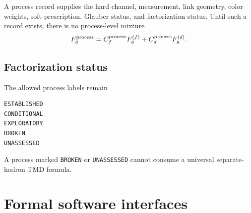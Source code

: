 \documentclass[11pt]{article}
\begin{document}
A process record supplies the hard channel, measurement, link geometry, color
weights, soft prescription, Glauber status, and factorization status.  Until
such a record exists, there is no process-level mixture
\begin{equation}
 F_g^{\rm process}
 =C_f^{\rm process}F_g^{(f)}
 +C_d^{\rm process}F_g^{(d)}.
 \label{eq:process-mixture}
\end{equation}

\subsection{Factorization status}

The allowed process labels remain
\begin{verbatim}
ESTABLISHED
CONDITIONAL
EXPLORATORY
BROKEN
UNASSESSED
\end{verbatim}
A process marked \texttt{BROKEN} or \texttt{UNASSESSED} cannot consume a
universal separate-hadron TMD formula.

\section{Formal software interfaces}
\label{sec:software}
\end{document}
